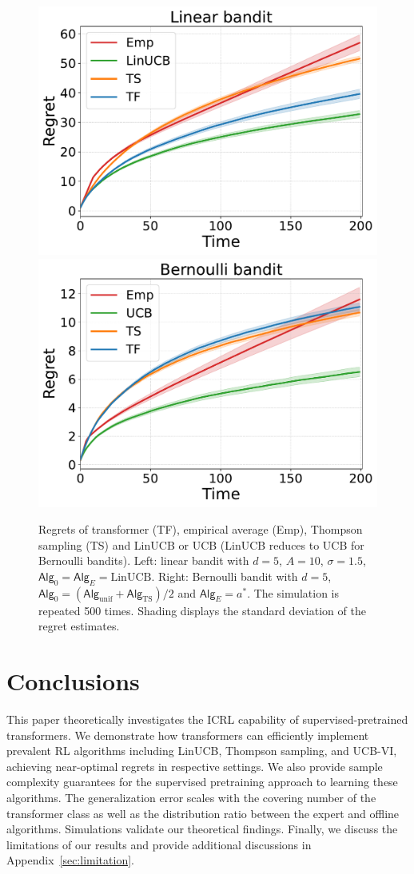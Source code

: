 \documentclass[10pt]{article}
\newcommand{\<}{\left\langle}
\renewcommand{\>}{\right\rangle}
\newcommand{\LinUCB}{{\mathrm{LinUCB}}}
\newcommand{\TS}{{\mathrm{TS}}}
\newcommand{\action}{{a}}
\newcommand{\sAlg}{{\mathsf{Alg}}}
\newcommand{\shortexp}{{E}}
\begin{document}
\begin{figure}[t]
\centering
\includegraphics[width=0.35\linewidth]{Sections/figs/record_2_cum_True.pdf}
\hspace{2em}
\includegraphics[width=0.35\linewidth]{Sections/figs/record_1_cum_True.pdf}
\vspace{-1em}
\caption{Regrets of transformer (TF), empirical average (Emp), Thompson sampling (TS) and LinUCB or UCB (LinUCB reduces to UCB for Bernoulli bandits). Left: linear bandit with $d=5$, $A=10$, $\sigma=1.5$, $\sAlg_0=\sAlg_\shortexp=\LinUCB$. Right: Bernoulli bandit with $d=5$, $\sAlg_0=(\sAlg_{\mathrm{unif}}+\sAlg_{\TS})/2$ and $\sAlg_\shortexp=\action^*$. The simulation is repeated 500 times. Shading displays the standard deviation of the regret estimates. }
\label{fig:regret_1}
\end{figure}


\section{Conclusions}

This paper theoretically investigates the ICRL capability of supervised-pretrained transformers. We demonstrate how transformers can efficiently implement prevalent RL algorithms including LinUCB, Thompson sampling, and UCB-VI, achieving near-optimal regrets in respective settings. We also provide sample complexity guarantees for the supervised pretraining approach to learning these algorithms. The generalization error scales with the covering number of the transformer class as well as the distribution ratio between the expert and offline algorithms. Simulations validate our theoretical findings.
Finally, we discuss the limitations of our results and provide additional discussions in Appendix~\ref{sec:limitation}.
\end{document}
